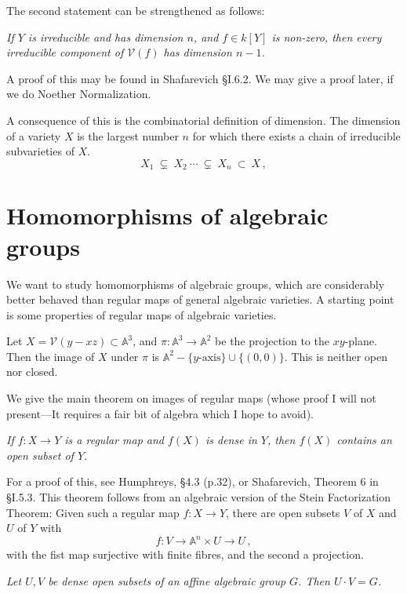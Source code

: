 \documentclass[12pt]{amsart}
\begin{document}
The second statement can be strengthened as follows:
\medskip

{\it 
If $Y$ is irreducible and has dimension $n$, and $f\in k[Y]$ is non-zero,
then every irreducible component of ${\mathcal V}(f)$ has dimension $n-1$.}
\medskip

A proof of this may be found in Shafarevich \S I.6.2.
We may give a proof later, if we do Noether Normalization.

A consequence of this is the combinatorial definition of dimension.
The dimension of a variety $X$ is the largest number $n$ for which there
exists a chain of irreducible subvarieties of $X$.
$$
   X_1\ \subsetneq\ X_2\ \cdots\ \subsetneq\ X_n\ \subset\  X\,,
$$ 


\section{Homomorphisms of algebraic groups}

We want to study homomorphisms of algebraic groups, which are considerably
better behaved than regular maps of general algebraic varieties.
A starting point is some properties of regular maps of algebraic
varieties.
\medskip

Let $X={\mathcal V}(y-xz)\subset{\mathbb A}^3$, and 
$\pi:{\mathbb A}^3\to{\mathbb A}^2$ be the projection to the $xy$-plane.
Then the image of $X$ under $\pi$ is
${\mathbb A}^2-\{\mbox{$y$-axis}\} \cup \{(0,0)\}$.
This is neither open nor closed.
\medskip

We give the main theorem on images of regular maps (whose proof I will not
present---It requires a fair bit of algebra which I hope to avoid).
\medskip

{\it
If $f\colon X\to Y$ is a regular map and $f(X)$ is dense in $Y$, then $f(X)$
contains an open subset of $Y$.
}\medskip

For a proof of this, see Humphreys, \S4.3 (p.32), or Shafarevich, Theorem 6
in \S I.5.3.
This theorem follows from an algebraic version of the Stein Factorization
Theorem: 
Given such a regular map $f\colon X\to Y$, there are open subsets $V$ of $X$
and $U$ of $Y$ with 
$$
  f\colon V\to {\mathbb A}^n\times U \to U\,,
$$
with the fist map surjective with finite fibres, and the second a
projection.
\medskip

{\it 
Let $U,V$ be dense open subsets of an affine algebraic group $G$.
Then $U\cdot V=G$.
}\medskip
\end{document}
